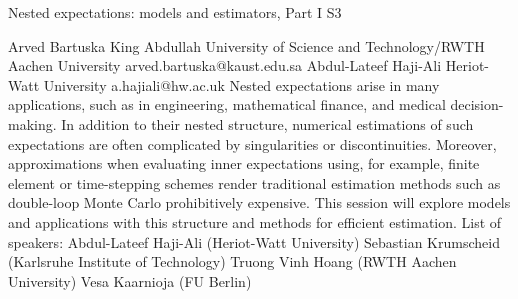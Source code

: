 \begin{session}
 {Nested expectations: models and estimators, Part I}%
 {}%
 {}%
 {}%
 {}%
 {}%
 {}%
 {S3}%
 {\thirdorganizer{}{}{}}%

 {Arved Bartuska}%
 {King Abdullah University of Science and Technology/RWTH Aachen University}%
 {arved.bartuska@kaust.edu.sa}%
 {Abdul-Lateef Haji-Ali }%
 {Heriot-Watt University}%
 {a.hajiali@hw.ac.uk}%
 Nested expectations
 arise in many applications, such as in engineering, mathematical finance, and medical decision-making. In addition to their nested structure, numerical estimations of such expectations are often complicated by singularities or discontinuities. Moreover, approximations when evaluating inner expectations using, for example, finite element or time-stepping schemes render traditional estimation methods such as double-loop Monte Carlo prohibitively expensive. This session will explore models and applications with this structure and methods for efficient estimation.
 List of speakers:
 Abdul-Lateef Haji-Ali (Heriot-Watt University)
 Sebastian Krumscheid (Karlsruhe Institute of Technology)
 Truong Vinh Hoang (RWTH Aachen University)
 Vesa Kaarnioja (FU Berlin)
\end{session}



\clearpage

